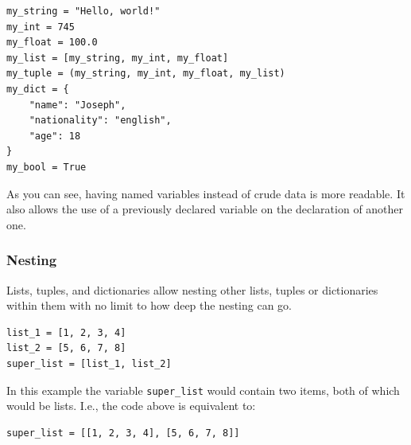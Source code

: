 \documentclass[a4paper,12pt]{article}
\begin{document}
\begin{tcolorbox}[
    enhanced,
    attach boxed title to top left={xshift=6mm,yshift=-3mm},
    colback=lightgreen!20,
    colframe=lightgreen,
    colbacktitle=lightgreen,
    title=Python,
    fonttitle=\bfseries\color{black},
    boxed title style={size=small,colframe=lightgreen,sharp corners},
    sharp corners,
    ]
    \begin{verbatim}
my_string = "Hello, world!"
my_int = 745
my_float = 100.0
my_list = [my_string, my_int, my_float]
my_tuple = (my_string, my_int, my_float, my_list)
my_dict = {
    "name": "Joseph",
    "nationality": "english",
    "age": 18
}
my_bool = True
    \end{verbatim}
\end{tcolorbox}

As you can see, having named variables instead of crude data is more readable. It also allows the use of a previously declared variable on the declaration of another one.

\subsubsection{Nesting}

Lists, tuples, and dictionaries allow nesting other lists, tuples or dictionaries within them with no limit to how deep the nesting can go.

\begin{tcolorbox}[
    enhanced,
    attach boxed title to top left={xshift=6mm,yshift=-3mm},
    colback=lightgreen!20,
    colframe=lightgreen,
    colbacktitle=lightgreen,
    title=Python,
    fonttitle=\bfseries\color{black},
    boxed title style={size=small,colframe=lightgreen,sharp corners},
    sharp corners,
    ]
    \begin{verbatim}
list_1 = [1, 2, 3, 4]
list_2 = [5, 6, 7, 8]
super_list = [list_1, list_2]
    \end{verbatim}
\end{tcolorbox}

In this example the variable \verb|super_list| would contain two items, both of which would be lists. I.e., the code above is equivalent to:

\begin{tcolorbox}[
    enhanced,
    attach boxed title to top left={xshift=6mm,yshift=-3mm},
    colback=lightgreen!20,
    colframe=lightgreen,
    colbacktitle=lightgreen,
    title=Python,
    fonttitle=\bfseries\color{black},
    boxed title style={size=small,colframe=lightgreen,sharp corners},
    sharp corners,
    ]
    \begin{verbatim}
super_list = [[1, 2, 3, 4], [5, 6, 7, 8]]
    \end{verbatim}
\end{tcolorbox}
\end{document}
